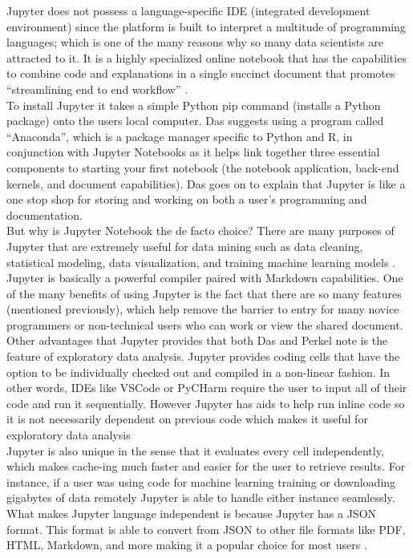 \documentclass[conference]{IEEEtran}
\begin{document}
Jupyter does not possess a language-specific IDE (integrated development environment) since the platform is built to interpret a multitude of programming languages; which  is one of the many reasons why so many data scientists are attracted to it. It is a highly specialized online notebook that has the capabilities to combine code and explanations in a single succinct document that promotes “streamlining end to end workflow” \cite{b2}.\\
  
To install Jupyter it takes a simple Python pip command (installs a Python package) onto the users local computer. Das suggests using a program called “Anaconda”, which is a package manager specific to Python and R, in conjunction with Jupyter Notebooks as it helps link together three essential components to starting your first notebook (the notebook application, back-end kernels, and document capabilities). Das goes on to explain that Jupyter is like a one stop shop for storing and working on both a user’s programming and documentation.\\
    
But why is Jupyter Notebook the de facto choice? There are many purposes of Jupyter that are extremely useful  for data mining such as data cleaning, statistical modeling, data visualization, and training machine learning models \cite{b2}. Jupyter is basically a powerful compiler paired with Markdown capabilities. One of the many benefits of using Jupyter is the fact that there are so many features (mentioned previously), which help remove the barrier to entry for many novice programmers or non-technical users who can work or view the shared document. \\

Other advantages that Jupyter provides that both Das \cite{b2} and Perkel \cite{b1} note is the feature of exploratory data analysis. Jupyter provides coding cells that have the option to be individually checked out and compiled in a non-linear fashion.  In other words, IDEs like VSCode or PyCHarm require the user to input all of their code and run it sequentially. However Jupyter  has aids to help run inline code so it is not necessarily dependent on previous code which makes it   useful for exploratory data analysis \cite{b2}\\
    
Jupyter is also unique in the sense that it evaluates every cell independently, which makes cache-ing much faster and easier for the user to retrieve results. For instance, if a user was using code for machine learning training or downloading gigabytes of data remotely Jupyter is able to handle either instance seamlessly. What makes Jupyter language independent is because Jupyter has a JSON format. This format is able to convert from JSON to other file formats like PDF, HTML, Markdown, and more making it a popular choice for most users \cite{b2}.\\
\end{document}
